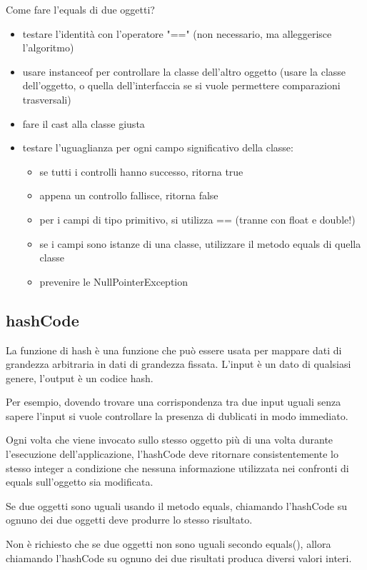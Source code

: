 \documentclass[a4paper,12pt,twoside]{book}
\begin{document}
Come fare l'equals di due oggetti?
\begin{itemize}
\item testare l'identità con l'operatore "==" (non necessario, ma
  alleggerisce l'algoritmo)
\item usare instanceof per controllare la classe dell'altro oggetto
  (usare la classe dell'oggetto, o quella dell'interfaccia se si vuole
  permettere comparazioni trasversali)
\item fare il cast alla classe giusta
\item testare l'uguaglianza per ogni campo significativo
  della classe:
  \begin{itemize}
  \item se tutti i controlli hanno successo, ritorna true
  \item appena un controllo fallisce, ritorna false
  \item per i campi di tipo primitivo, si utilizza == (tranne con float e
    double!)
  \item se i campi sono istanze di una classe, utilizzare il metodo
    equals di quella classe
  \item prevenire le NullPointerException
  \end{itemize}
\end{itemize}
\subsection{hashCode}
La funzione di hash è una funzione che può essere usata per mappare
dati di grandezza arbitraria in dati di grandezza fissata. L'input è
un dato di qualsiasi genere, l'output è un codice hash.

Per esempio, dovendo trovare una corrispondenza tra due input uguali
senza sapere l'input si vuole controllare la presenza di dublicati in
modo immediato.


Ogni volta che viene invocato sullo stesso oggetto più di una volta
durante l'esecuzione dell'applicazione, l'hashCode deve ritornare
consistentemente lo stesso integer a condizione che nessuna
informazione utilizzata nei confronti di equals sull'oggetto sia
modificata.

Se due oggetti sono uguali usando il metodo equals, chiamando
l'hashCode su ognuno dei due oggetti deve produrre lo stesso
risultato.

Non è richiesto che se due oggetti non sono uguali secondo equals(),
allora chiamando l'hashCode su ognuno dei due risultati produca
diversi valori interi.
\end{document}
